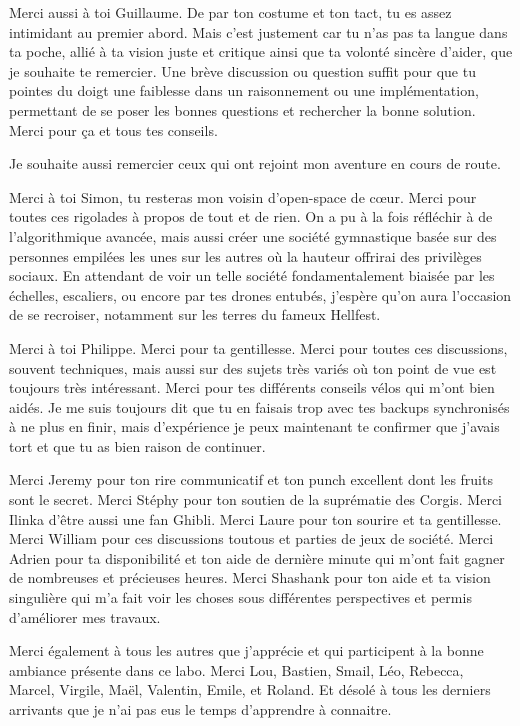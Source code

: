 Merci aussi à toi Guillaume. 
De par ton costume et ton tact, tu es assez intimidant au premier abord. 
Mais c'est justement car tu n'as pas ta langue dans ta poche, allié à ta vision juste et critique ainsi que ta volonté sincère d'aider, que je souhaite te remercier. Une brève discussion ou question suffit pour que tu pointes du doigt une faiblesse dans un raisonnement ou une implémentation, permettant de se poser les bonnes questions et rechercher la bonne solution. Merci pour ça et tous tes conseils.



Je souhaite aussi remercier ceux qui ont rejoint mon aventure en cours de route.  

Merci à toi Simon, tu resteras mon voisin d'open-space de cœur. Merci pour toutes ces rigolades à propos de tout et de rien. On a pu à la fois réfléchir à de l'algorithmique avancée, mais aussi créer une société gymnastique basée sur des personnes empilées les unes sur les autres où la hauteur offrirai des privilèges sociaux. En attendant de voir un telle société fondamentalement biaisée par les échelles, escaliers, ou encore par tes drones entubés, j'espère qu'on aura l'occasion de se recroiser, notamment sur les terres du fameux Hellfest.

Merci à toi Philippe. Merci pour ta gentillesse. Merci pour toutes ces discussions, souvent techniques, mais aussi sur des sujets très variés où ton point de vue est toujours très intéressant. Merci pour tes différents conseils vélos qui m'ont bien aidés. 
Je me suis toujours dit que tu en faisais trop avec tes backups synchronisés à ne plus en finir, mais d'expérience je peux maintenant te confirmer que j'avais tort et que tu as bien raison de continuer.   

Merci Jeremy pour ton rire communicatif et ton punch excellent dont les fruits sont le secret. 
Merci Stéphy pour ton soutien de la suprématie des Corgis. 
Merci Ilinka d'être aussi une fan Ghibli. 
Merci Laure pour ton sourire et ta gentillesse.
Merci William pour ces discussions toutous et parties de jeux de société. 
Merci Adrien pour ta disponibilité et ton aide de dernière minute qui m'ont fait gagner de nombreuses et précieuses heures.
Merci Shashank pour ton aide et ta vision singulière qui m'a fait voir les choses sous différentes perspectives et permis d'améliorer mes travaux. 

Merci également à tous les autres que j'apprécie et qui participent à la bonne ambiance présente dans ce labo. 
Merci Lou, Bastien, Smail, Léo, Rebecca, Marcel, Virgile, Maël, Valentin, Emile, et Roland. 
Et désolé à tous les derniers arrivants que je n'ai pas eus le temps d'apprendre à connaitre. 

